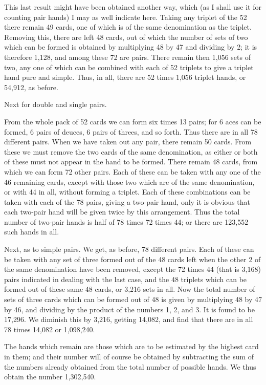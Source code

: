 \documentclass[letterpaper,12pt,oneside,openany]{memoir}
\begin{document}
This last result might have been obtained another
way, which (as I shall use it for counting pair hands) I
may as well indicate here. Taking any triplet of the
52 there remain 49 cards, one of which is of the same
denomination as the triplet. Removing this, there are
left 48 cards, out of which the number of sets of two
which can be formed is obtained by multiplying 48 by
47 and dividing by 2; it is therefore 1,128, and among
these 72 are pairs. There remain then 1,056 sets of
two, any one of which can be combined with each of
52 triplets to give a triplet hand pure and simple.
Thus, in all, there are 52 times 1,056 triplet hands, or
54,912, as before.

Next for double and single pairs.

From the whole pack of 52 cards we can form six
times 13 pairs; for 6 aces can be formed, 6 pairs of
deuces, 6 pairs of threes, and so forth. Thus there are
in all 78 different pairs. When we have taken out any
pair, there remain 50 cards. From these we must remove
the two cards of the same denomination, as either or
both of these must not appear in the hand to be formed.
There remain 48 cards, from which we can form 72
other pairs. Each of these can be taken with any one
of the 46 remaining cards, except with those two which
are of the same denomination, or with 44 in all, without
forming a triplet. Each of these combinations can
be taken with each of the 78 pairs, giving a two-pair
hand, only it is obvious that each two-pair hand will be
given twice by this arrangement. Thus the total
number of two-pair hands is half of 78 times 72 times
44; or there are 123,552 such hands in all.

Next, as to simple pairs. We get, as before, 78
different pairs. Each of these can be taken with any
set of three formed out of the 48 cards left when the
other 2 of the same denomination have been removed,
except the 72 times 44 (that is 3,168) pairs indicated
in dealing with the last case, and the 48 triplets which
can be formed out of these same 48 cards, or 3,216 sets
in all. Now the total number of sets of three cards
which can be formed out of 48 is given by multiplying
48 by 47 by 46, and dividing by the product of the
numbers 1, 2, and 3. It is found to be 17,296. We
diminish this by 3,216, getting 14,082, and find that
there are in all 78 times 14,082 or 1,098,240.

The hands which remain are those which are to be
estimated by the highest card in them; and their number
will of course be obtained by subtracting the sum
of the numbers already obtained from the total number
of possible hands. We thus obtain the number
1,302,540.
\end{document}
